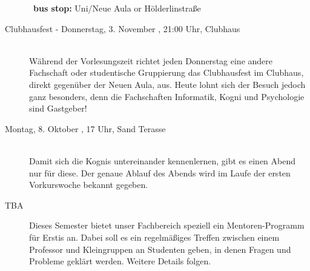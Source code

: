\begin{description}
        ~\textbf{bus stop:} Uni/Neue Aula or Hölderlinstraße
\else
    \item[Clubhausfest - Donnerstag, 3. November \YEAR, 21:00 Uhr, Clubhaus]\ \\
        Während der Vorlesungszeit richtet jeden Donnerstag eine andere Fachschaft oder studentische Gruppierung das Clubhausfest im Clubhaus, direkt gegenüber der Neuen Aula, aus. Heute lohnt sich der Besuch jedoch ganz besonders, denn die Fachschaften Informatik, Kogni und Psychologie sind Gastgeber!

\fi

\ifkogwiss
    \item[Montag, 8. Oktober \YEAR, 17 Uhr, Sand Terasse ]\ \\
    Damit sich die Kognis untereinander kennenlernen, gibt es einen Abend nur für diese. Der genaue Ablauf des Abends wird im Laufe der ersten Vorkurswoche bekannt gegeben.
\fi

\ifbachelor
	\item[TBA] Dieses Semester bietet unser Fachbereich speziell ein Mentoren-Programm für Erstis an. Dabei soll es ein regelmäßiges Treffen zwischen einem Professor und Kleingruppen an Studenten geben, in denen Fragen und Probleme geklärt werden. Weitere Details folgen.
\fi

\end{description}
